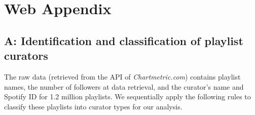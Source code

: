 \section*{Web Appendix}




\setcounter{figure}{0}

\setcounter{table}{0}

\setcounter{footnote}{0}


\renewcommand\thefigure{W\arabic{figure}}
\renewcommand\thetable{W\arabic{table}}


\subsection*{A: Identification and classification of playlist curators}
\label{curators}


The raw data (retrieved from the API of \textit{Chartmetric.com}) contains playlist names, the number of followers at data retrieval, and the curator's name and Spotify ID for 1.2 million playlists. We sequentially apply the following rules to classify these playlists into curator types for our analysis.

